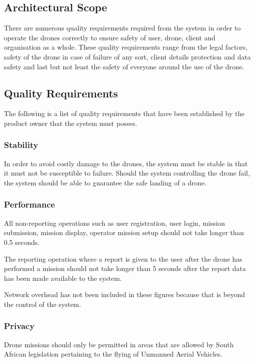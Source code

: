 \documentclass{article}
\begin{document}
	\subsection{Architectural Scope}%
	There are numerous quality requirements required from the system in order to operate the drones correctly to ensure safety of user, drone, client and organisation as a whole. These quality requirements range from the legal factors, safety of the drone in case of failure of any sort, client details protection and data safety and last but not least the safety of everyone around the use of the drone.
	
	\setlength{\leftskip}{45px}
		
	\subsection{Quality Requirements}%
	The following is a list of quality requirements that have been established by the product owner that the system must posses.
	\subsubsection{Stability}
	\setlength{\leftskip}{61px}
	In order to avoid costly damage to the drones, the system must be stable in that it must not be susceptible to failure. Should the system controlling the drone fail, the system should be able to guarantee the safe landing of a drone.
	
	\subsubsection{Performance}
	All non-reporting operations such as user registration, user login, mission submission, mission display, operator mission setup should not take longer than 0.5 seconds.
	
	The reporting operation where a report is given to the user after the drone has performed a mission should not take longer than 5 seconds after the report data has been made available to the system.
	
	Network overhead has not been included in these figures because that is beyond the control of the system.
	
	\subsubsection{Privacy}
	Drone missions should only be permitted in areas that are allowed by South African legislation pertaining to the flying of Unmanned Aerial Vehicles.
	
\end{document}
